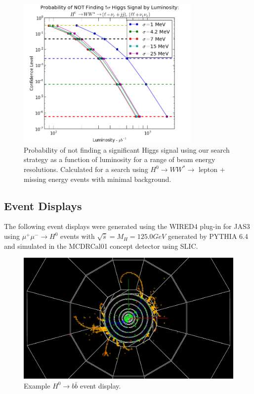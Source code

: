 \documentclass[a4paper]{article}
\begin{document}
	\begin{figure}[H]
		\includegraphics[width=0.8\textwidth]{lum-needed-ww-cut}
		\caption{Probability of not finding a significant Higgs signal using our search strategy as a function of luminosity for a range of beam energy resolutions. Calculated for a search using $H^0\rightarrow WW^*\rightarrow$ lepton + missing energy events with minimal background.\label{fig:lum-needed-ww-cut}}
	\end{figure}

\subsection{Event Displays}
\label{sec:evt-display}
The following event displays were generated using the WIRED4 plug-in for JAS3 using $\mu^+\mu^-\rightarrow H^0$ events with $\sqrt{\hat{s}} = M_H = 125.0 GeV$ generated by PYTHIA 6.4 and simulated in the MCDRCal01 concept detector using SLIC.\@

\begin{figure}[h]
	\includegraphics[width=\textwidth]{h-bbbar}
	\caption{Example $H^0\rightarrow b\bar{b}$ event display.\label{fig:evt-disp-bbbar}}
\end{figure}
\end{document}
